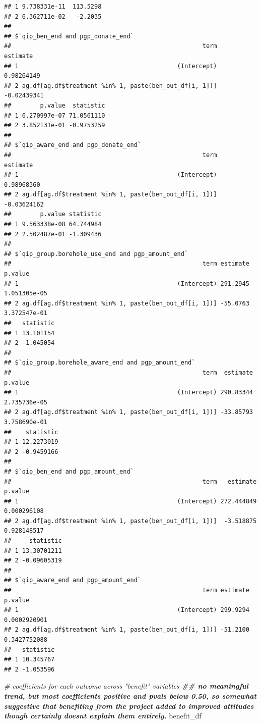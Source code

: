 \documentclass[
]{article}
\newenvironment{Shaded}{\begin{snugshade}}{\end{snugshade}}
\newcommand{\CommentTok}[1]{\textcolor[rgb]{0.56,0.35,0.01}{\textit{#1}}}
\newcommand{\DocumentationTok}[1]{\textcolor[rgb]{0.56,0.35,0.01}{\textbf{\textit{#1}}}}
\newcommand{\NormalTok}[1]{#1}
\begin{document}
\begin{verbatim}
## 1 9.738331e-11  113.5298
## 2 6.362711e-02   -2.2035
## 
## $`qip_ben_end and pgp_donate_end`
##                                                     term    estimate
## 1                                            (Intercept)  0.98264149
## 2 ag.df[ag.df$treatment %in% 1, paste(ben_out_df[i, 1])] -0.02439341
##        p.value  statistic
## 1 6.270997e-07 71.0561110
## 2 3.852131e-01 -0.9753259
## 
## $`qip_aware_end and pgp_donate_end`
##                                                     term    estimate
## 1                                            (Intercept)  0.98968360
## 2 ag.df[ag.df$treatment %in% 1, paste(ben_out_df[i, 1])] -0.03624162
##        p.value statistic
## 1 9.563338e-08 64.744984
## 2 2.502487e-01 -1.309436
## 
## $`qip_group.borehole_use_end and pgp_amount_end`
##                                                     term estimate      p.value
## 1                                            (Intercept) 291.2945 1.051305e-05
## 2 ag.df[ag.df$treatment %in% 1, paste(ben_out_df[i, 1])] -55.0763 3.372547e-01
##   statistic
## 1 13.101154
## 2 -1.045054
## 
## $`qip_group.borehole_aware_end and pgp_amount_end`
##                                                     term  estimate      p.value
## 1                                            (Intercept) 290.83344 2.735736e-05
## 2 ag.df[ag.df$treatment %in% 1, paste(ben_out_df[i, 1])] -33.85793 3.758690e-01
##    statistic
## 1 12.2273019
## 2 -0.9459166
## 
## $`qip_ben_end and pgp_amount_end`
##                                                     term   estimate     p.value
## 1                                            (Intercept) 272.444849 0.000296108
## 2 ag.df[ag.df$treatment %in% 1, paste(ben_out_df[i, 1])]  -3.518875 0.928148517
##     statistic
## 1 13.30701211
## 2 -0.09605319
## 
## $`qip_aware_end and pgp_amount_end`
##                                                     term estimate      p.value
## 1                                            (Intercept) 299.9294 0.0002920901
## 2 ag.df[ag.df$treatment %in% 1, paste(ben_out_df[i, 1])] -51.2100 0.3427752088
##   statistic
## 1 10.345767
## 2 -1.053596
\end{verbatim}

\begin{Shaded}
\begin{Highlighting}[]
\CommentTok{\# coefficients for each outcome across "benefit" variables}
\DocumentationTok{\#\# no meaningful trend, but most coefficients positive and pvals below 0.50, so somewhat suggestive that benefiting from the project added to improved attitudes though certainly doesn\textquotesingle{}t explain them entirely.}
\NormalTok{benefit\_df}
\end{Highlighting}
\end{Shaded}
\end{document}
